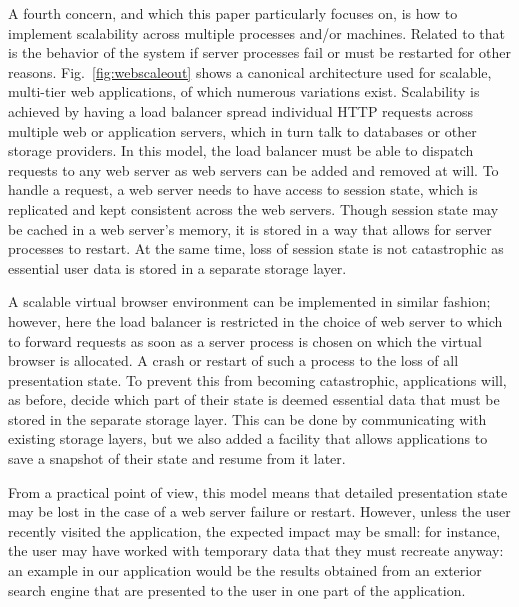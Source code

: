 A fourth concern, and which this paper particularly focuses on, is how to implement
scalability across multiple processes and/or machines. Related to that is the 
behavior of the system if server processes fail or must be restarted for other reasons.
Fig.~\ref{fig:webscaleout} shows a canonical architecture used for scalable, multi-tier web 
applications, of which numerous variations exist.  Scalability is achieved
by having a load balancer spread individual HTTP requests across multiple
web or application servers, which in turn talk to databases or other storage
providers.  In this model, the load balancer must be able to dispatch requests 
to any web server as web servers can be added and removed at will. To handle a 
request, a web server needs to have access to session state, which is replicated
and kept consistent across the web servers.  Though session state may be cached
in a web server's memory, it is stored in a way that allows for server processes
to restart.  At the same time, loss of session state is not catastrophic
as essential user data is stored in a separate storage layer.

A scalable virtual browser environment can be implemented in similar fashion;
however, here the load balancer is restricted in the choice of web server to 
which to forward requests as soon as a server process is chosen on which the
virtual browser is allocated.  A crash or restart of such a process 
to the loss of all presentation state.  To prevent this from becoming 
catastrophic, applications will, as before, decide which part of their
state is deemed essential data that must be stored in the separate storage
layer.  This can be done by communicating with existing storage layers,
but we also added a facility that allows applications to save a snapshot
of their state and resume from it later.

From a practical point of view, this model means that detailed presentation
state may be lost in the case of a web server failure or restart.
However, unless the user recently visited the application, the expected 
impact may be small: for instance, the user may have worked with temporary 
data that they must recreate anyway: an example in our application would be
the results obtained from an exterior search engine that are presented 
to the user in one part of the application.

\architectureoverview{}

